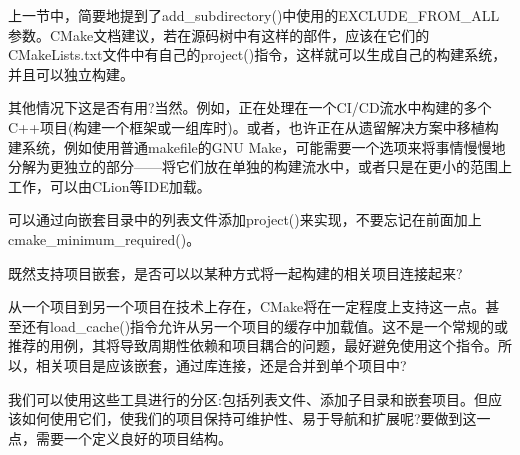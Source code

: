 
上一节中，简要地提到了add\_subdirectory()中使用的EXCLUDE\_FROM\_ALL参数。CMake文档建议，若在源码树中有这样的部件，应该在它们的CMakeLists.txt文件中有自己的project()指令，这样就可以生成自己的构建系统，并且可以独立构建。

其他情况下这是否有用?当然。例如，正在处理在一个CI/CD流水中构建的多个C++项目(构建一个框架或一组库时)。或者，也许正在从遗留解决方案中移植构建系统，例如使用普通makefile的GNU Make，可能需要一个选项来将事情慢慢地分解为更独立的部分——将它们放在单独的构建流水中，或者只是在更小的范围上工作，可以由CLion等IDE加载。

可以通过向嵌套目录中的列表文件添加project()来实现，不要忘记在前面加上cmake\_minimum\_required()。

既然支持项目嵌套，是否可以以某种方式将一起构建的相关项目连接起来?


从一个项目到另一个项目在技术上存在，CMake将在一定程度上支持这一点。甚至还有load\_cache()指令允许从另一个项目的缓存中加载值。这不是一个常规的或推荐的用例，其将导致周期性依赖和项目耦合的问题，最好避免使用这个指令。所以，相关项目是应该嵌套，通过库连接，还是合并到单个项目中?

我们可以使用这些工具进行的分区:包括列表文件、添加子目录和嵌套项目。但应该如何使用它们，使我们的项目保持可维护性、易于导航和扩展呢?要做到这一点，需要一个定义良好的项目结构。